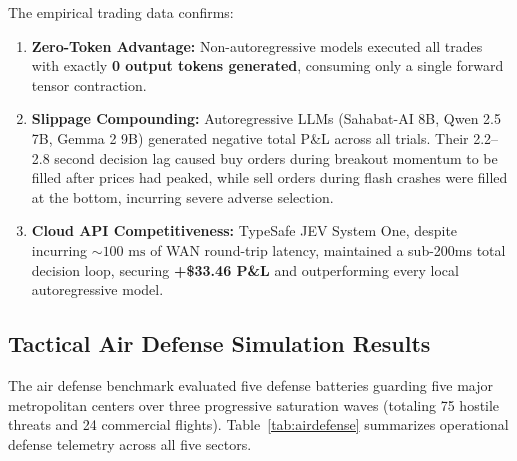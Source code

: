 \documentclass[journal,compsoc]{IEEEtran}
\begin{document}
The empirical trading data confirms:
\begin{enumerate}
    \item \textbf{Zero-Token Advantage:} Non-autoregressive models executed all trades with exactly \textbf{0 output tokens generated}, consuming only a single forward tensor contraction.
    \item \textbf{Slippage Compounding:} Autoregressive LLMs (Sahabat-AI 8B, Qwen 2.5 7B, Gemma 2 9B) generated negative total P\&L across all trials. Their 2.2--2.8 second decision lag caused buy orders during breakout momentum to be filled after prices had peaked, while sell orders during flash crashes were filled at the bottom, incurring severe adverse selection.
    \item \textbf{Cloud API Competitiveness:} TypeSafe JEV System One, despite incurring $\sim 100 \text{ ms}$ of WAN round-trip latency, maintained a sub-200ms total decision loop, securing \textbf{+\$33.46 P\&L} and outperforming every local autoregressive model.
\end{enumerate}

\subsection{Tactical Air Defense Simulation Results}
The air defense benchmark evaluated five defense batteries guarding five major metropolitan centers over three progressive saturation waves (totaling 75 hostile threats and 24 commercial flights). Table~\ref{tab:airdefense} summarizes operational defense telemetry across all five sectors.
\end{document}
